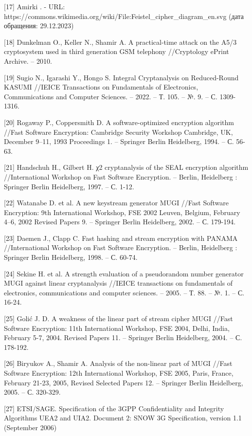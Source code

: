 \documentclass[colorthm]{./civarticle}
\begin{document}
[17] Amirki . - URL: https://commons.wikimedia.org/wiki/File:Feistel\_cipher\_diagram\_en.svg (дата обращения: 29.12.2023) 

[18] Dunkelman O., Keller N., Shamir A. A practical-time attack on the A5/3 cryptosystem used in third generation GSM telephony //Cryptology ePrint Archive. – 2010.

[19] Sugio N., Igarashi Y., Hongo S. Integral Cryptanalysis on Reduced-Round KASUMI //IEICE Transactions on Fundamentals of Electronics, Communications and Computer Sciences. – 2022. – Т. 105. – №. 9. – С. 1309-1316.

[20] Rogaway P., Coppersmith D. A software-optimized encryption algorithm //Fast Software Encryption: Cambridge Security Workshop Cambridge, UK, December 9–11, 1993 Proceedings 1. – Springer Berlin Heidelberg, 1994. – С. 56-63.

[21] Handschuh H., Gilbert H. χ2 cryptanalysis of the SEAL encryption algorithm //International Workshop on Fast Software Encryption. – Berlin, Heidelberg : Springer Berlin Heidelberg, 1997. – С. 1-12.

[22] Watanabe D. et al. A new keystream generator MUGI //Fast Software Encryption: 9th International Workshop, FSE 2002 Leuven, Belgium, February 4–6, 2002 Revised Papers 9. – Springer Berlin Heidelberg, 2002. – С. 179-194.

[23] Daemen J., Clapp C. Fast hashing and stream encryption with PANAMA //International Workshop on Fast Software Encryption. – Berlin, Heidelberg : Springer Berlin Heidelberg, 1998. – С. 60-74.

[24] Sekine H. et al. A strength evaluation of a pseudorandom number generator MUGI against linear cryptanalysis //IEICE transactions on fundamentals of electronics, communications and computer sciences. – 2005. – Т. 88. – №. 1. – С. 16-24.

[25] Golić J. D. A weakness of the linear part of stream cipher MUGI //Fast Software Encryption: 11th International Workshop, FSE 2004, Delhi, India, February 5-7, 2004. Revised Papers 11. – Springer Berlin Heidelberg, 2004. – С. 178-192.

[26] Biryukov A., Shamir A. Analysis of the non-linear part of MUGI //Fast Software Encryption: 12th International Workshop, FSE 2005, Paris, France, February 21-23, 2005, Revised Selected Papers 12. – Springer Berlin Heidelberg, 2005. – С. 320-329.

[27] ETSI/SAGE. Specification of the 3GPP Confidentiality and Integrity Algorithms UEA2 and UIA2. Document 2: SNOW 3G Specification, version 1.1 (September 2006)
\end{document}
